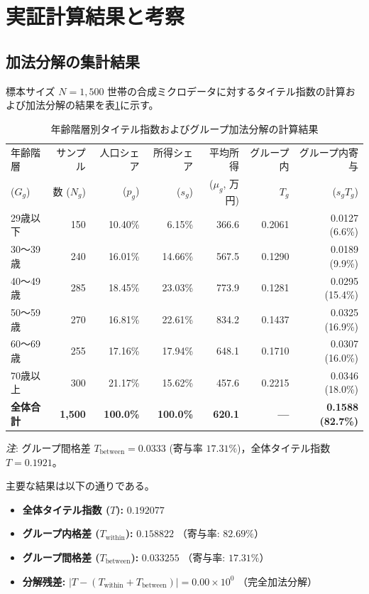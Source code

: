 \documentclass[paper=a4,fontsize=10.5pt,line_length=42zw]{jlreq}
\begin{document}
\section{実証計算結果と考察}

\subsection{加法分解の集計結果}
標本サイズ $N=1,500$ 世帯の合成ミクロデータに対するタイテル指数の計算および加法分解の結果を表\ref{tab:empirical_summary}に示す。

\begin{table}[htbp]
\centering
\caption{年齢階層別タイテル指数およびグループ加法分解の計算結果}
\label{tab:empirical_summary}
\footnotesize
\begin{tabularx}{\linewidth}{lrrrrrr}
\toprule
年齢階層 & サンプル & 人口シェア & 所得シェア & 平均所得 & グループ内 & グループ内寄与 \\
($G_g$) & 数 ($N_g$) & ($p_g$) & ($s_g$) & ($\mu_g$, 万円) & $T_g$ & ($s_g T_g$) \\
\midrule
29歳以下 & 150 & 10.40\% & 6.15\% & 366.6 & 0.2061 & 0.0127 (6.6\%) \\
30〜39歳 & 240 & 16.01\% & 14.66\% & 567.5 & 0.1290 & 0.0189 (9.9\%) \\
40〜49歳 & 285 & 18.45\% & 23.03\% & 773.9 & 0.1281 & 0.0295 (15.4\%) \\
50〜59歳 & 270 & 16.81\% & 22.61\% & 834.2 & 0.1437 & 0.0325 (16.9\%) \\
60〜69歳 & 255 & 17.16\% & 17.94\% & 648.1 & 0.1710 & 0.0307 (16.0\%) \\
70歳以上 & 300 & 21.17\% & 15.62\% & 457.6 & 0.2215 & 0.0346 (18.0\%) \\
\midrule
\textbf{全体合計} & \textbf{1,500} & \textbf{100.0\%} & \textbf{100.0\%} & \textbf{620.1} & \textbf{—} & \textbf{0.1588 (82.7\%)} \\
\bottomrule
\end{tabularx}
\vspace{0.3em}
\raggedright\scriptsize\textit{注}: グループ間格差 $T_{\text{between}} = 0.0333$ (寄与率 $17.31\%$)，全体タイテル指数 $T = 0.1921$。
\end{table}

主要な結果は以下の通りである。
\begin{itemize}
    \item \textbf{全体タイテル指数 ($T$):} $0.192077$
    \item \textbf{グループ内格差 ($T_{\text{within}}$):} $0.158822$ （寄与率: \textbf{$82.69\%$}）
    \item \textbf{グループ間格差 ($T_{\text{between}}$):} $0.033255$ （寄与率: \textbf{$17.31\%$}）
    \item \textbf{分解残差:} $|T - (T_{\text{within}} + T_{\text{between}})| = 0.00 \times 10^0$ （完全加法分解）
\end{itemize}
\end{document}
